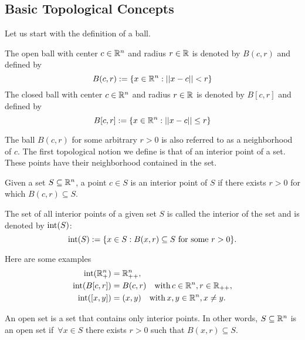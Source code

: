 \documentclass[10pt,a4paper]{article}
\begin{document}
\subsection{Basic Topological Concepts}
Let us start with the definition of a ball.
\begin{definition} The open ball with center $c\in \mathbb{R}^n$ and radius $r \in \mathbb{R}$ is denoted by $B(c,r)$ and defined by 
\begin{equation*}
	B(c,r) := \{x\in\mathbb{R}^n: ||x-c||< r\}
\end{equation*}
The closed ball with center $c\in \mathbb{R}^n$ and radius $r \in \mathbb{R}$ is denoted by $B[c,r]$ and defined by 
\begin{equation*}
B[c,r] := \{x\in\mathbb{R}^n: ||x-c||\leq r\}
\end{equation*}
\end{definition}
\noindent The ball $B(c, r)$ for some arbitrary $r>0$ is also referred to as a neighborhood of $c$. The first topological notion we define is that of an interior point of a set. These points have their neighborhood contained in the set.
\begin{definition} Given a set $S \subseteq\mathbb{R}^n$, a point $c\in S$ is an interior point of $S$ if there exists $r>0$ for which $B(c,r) \subseteq S$.
\end{definition}
\noindent The set of all interior points of a given set $S$ is called the interior of the set and is denoted by $\mathord{\mathrm{int}}(S)$:
\begin{equation*}
	\mathord{\mathrm{int}}(S) :=\{x\in S: B(x,r)\subseteq S \text{ for some } r>0\}.
\end{equation*}
\begin{example}
	Here are some examples 
	\begin{equation*}
		\begin{split}
			\mathord{\mathrm{int}}(\mathbb{R}^n_+) &= \mathbb{R}^n_{++},\\
			\mathord{\mathrm{int}}(B[c,r]) &= B(c,r) \quad \mathord{\mathrm{with }}\, c \in \mathbb{R}^n, r \in \mathbb{R}_{++},\\
			\mathord{\mathrm{int}}([x,y]) &= (x,y)\quad \mathord{\mathrm{with }}\, x,y \in \mathbb{R}^n, x\neq y.
		\end{split}
	\end{equation*}
\end{example}
\begin{definition}
	An open set is a set that contains only interior points. In other words, $S\subseteq \mathbb{R}^n$ is an open set if $\,\forall x \in S$ there exists $r>0$ such that $B(x,r)\subseteq S$.
\end{definition}
\end{document}
